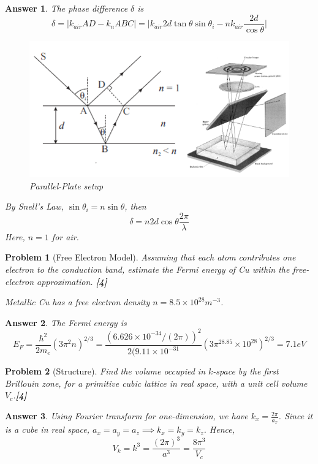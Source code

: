 \documentclass[a4paper]{article}
\newtheorem{ans}{Answer}[subsection]
\theoremstyle{new}
\newtheorem{qns}{Problem}[subsection]
\begin{document}
\begin{ans}
The phase difference $\delta$ is
$$\delta=|k_{air}AD-k_nABC|=\bigg|k_{air}2d\tan\theta\sin\theta_i-nk_{air}\frac{2d}{\cos\theta}\bigg|$$
\begin{figure}[H]
    \centering
    \includegraphics[width=\linewidth]{thinfilm.PNG}
    \caption{Parallel-Plate setup}
\end{figure}
By Snell's Law, $\sin\theta_i=n\sin\theta$, then
$$\delta=n2d\cos\theta\frac{2\pi}{\lambda}$$
Here, $n=1$ for air.
\end{ans}
\newpage
\begin{qns}[Free Electron Model]
Assuming that each atom contributes one electron to the conduction band, estimate the Fermi energy of Cu within the free-electron approximation. \hfill\textbf{[4]}
\begin{mdframed}
Metallic Cu has a free electron density $n=8.5\times10^{28}m^{-3}$.
\end{mdframed}
\end{qns}
\begin{ans}
The Fermi energy is
$$E_F=\frac{\hbar^2}{2m_e}(3\pi^2n)^{2/3}=\frac{(6.626\times10^{-34}/(2\pi))^2}{2(9.11\times10^{-31}}(3\pi^28.85\times10^{28})^{2/3}=7.1eV$$
\end{ans}
\begin{qns}[Structure]
Find the volume occupied in $k$-space by the first Brillouin zone, for a primitive cubic lattice in real space, with a unit cell volume $V_c$.\hfill\textbf{[4]}
\end{qns}
\begin{ans}
Using Fourier transform for one-dimension, we have $k_x=\frac{2\pi}{a_x}$. Since it is a cube in real space, $a_x=a_y=a_z\implies k_x=k_y=k_z$. Hence,
$$V_k=k^3=\frac{(2\pi)^3}{a^3}=\frac{8\pi^3}{V_c}$$
\end{ans}
\end{document}
